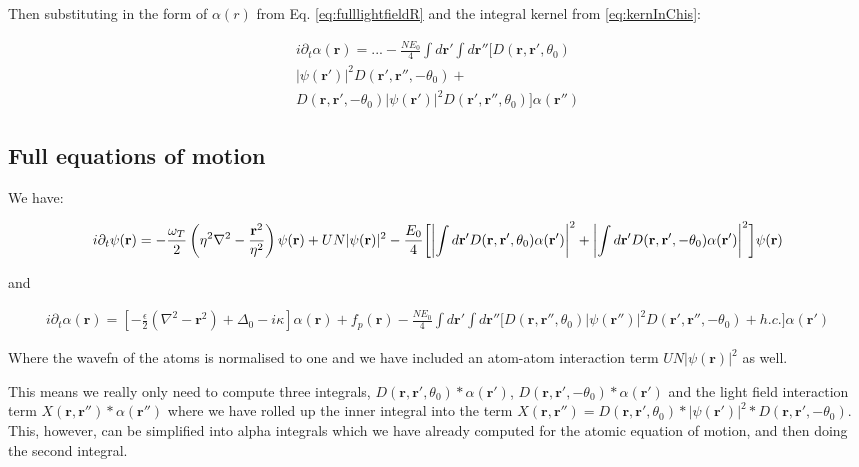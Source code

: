 \documentclass[a4paper,twocolumn,nobalancelastpage]{revtex4-1}
\newcommand{\vect}[1]{\mathbf{#1}}
\DeclarePairedDelimiter\abs{\lvert}{\rvert}
\begin{document}
Then substituting in the form of $\alpha(r)$ from Eq. \ref{eq:fulllightfieldR} and the integral kernel from \ref{eq:kernInChis}:

\begin{multline}
i\partial_t \alpha(\textbf{r})= ... - \frac{N E_0}{4}
\int d\textbf{r}' \int d\textbf{r}''
\bigg[
D(\textbf{r},\textbf{r}',\theta_0) \\  |\psi(\textbf{r}')|^2 D(\textbf{r}',\textbf{r}'',-\theta_0) +\\
D(\textbf{r},\textbf{r}',-\theta_0)  |\psi(\textbf{r}')|^2 D(\textbf{r}',\textbf{r}'',\theta_0)
\bigg]
\alpha(\textbf{r}'')
\end{multline}

\subsection{Full equations of motion}

We have:


\begin{widetext}

\begin{multline}
\label{eq:realspaceatoms}
i\partial_t \psi(\textbf{r})= - \frac{\omega_T}{2} 
 \left( \eta^2 \nabla^2-\frac{\textbf{r}^2}{\eta^2}\right) \psi(\textbf{r}) + UN |\psi(\textbf{r})|^2- \frac{E_0}{4}  \bigg[ \abs*{ \int d\textbf{r}' D(\textbf{r}, \textbf{r}',\theta_0) \alpha(\textbf{r}')} ^2+\abs*{\int d\textbf{r}' D(\textbf{r},\textbf{r}',-\theta_0) \alpha(\textbf{r}')}^2 \bigg] \psi(\vect{r})
\end{multline}

and 

\begin{multline}
\label{eq:realspacelight}
i\partial_t \alpha(\textbf{r})=  \left[ -\frac{\epsilon}{2} \left( \nabla^2 - \textbf{r}^2 \right) + \Delta_0 -i\kappa \right] \alpha(\textbf{r}) + f_p(\textbf{r})- \frac{N E_0}{4}
 \int d\textbf{r}'\int d\textbf{r}'' \bigg[ D(\textbf{r},\textbf{r}'',\theta_0) |\psi(\textbf{r}'')|^2  D(\textbf{r}',\textbf{r}'',-\theta_0)  + h.c.\bigg]\alpha(\textbf{r}')
\end{multline}
\end{widetext}

Where the wavefn of the atoms is normalised to one and we have included an atom-atom interaction term $UN |\psi(\textbf{r})|^2$ as well.

This means we really only need to compute three integrals, $D(\textbf{r},\textbf{r}',\theta_0)*\alpha(\textbf{r}')$, $D(\textbf{r},\textbf{r}',-\theta_0)*\alpha(\textbf{r}')$ and the light field interaction term $X(\textbf{r},\textbf{r}'')*\alpha(\textbf{r}'')$ where we have rolled up the inner integral into the term $X(\textbf{r},\textbf{r}'')= D(\textbf{r},\textbf{r}',\theta_0)*|\psi(\textbf{r}')|^2*D(\textbf{r},\textbf{r}',-\theta_0)$. This, however, can be simplified into alpha integrals which we have already computed for the atomic equation of motion, and then doing the second integral.
 
\end{document}

